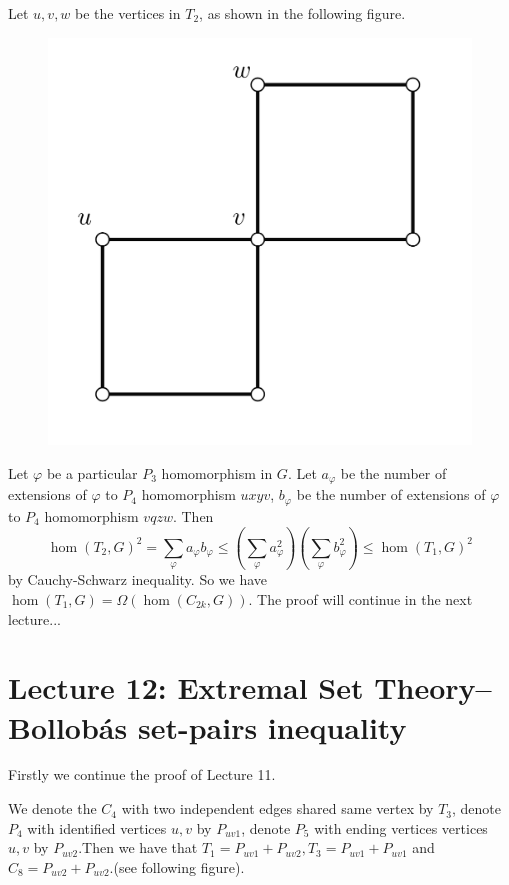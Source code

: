 \documentclass{article}
\theoremstyle{definition}
\renewcommand{\phi}{\varphi}
\begin{document}
Let $u,v,w$ be the vertices in $T_{2}$, as shown in the following figure.

\begin{figure}[H]
     \centering
     \includegraphics[scale=0.4]{11-5.png}
\end{figure}

Let $\phi$ be a particular $P_{3}$ homomorphism in $G$. Let $a_{\phi}$ be the number of extensions of $\phi$ to $P_{4}$ homomorphism $uxyv$, $b_{\phi}$ be the number of extensions of $\phi$ to $P_{4}$ homomorphism $vqzw$. Then
$$\hom(T_{2},G)^{2}=\sum_{\phi}a_{\phi}b_{\phi}\leq (\sum_{\phi}a_{\phi}^{2})(\sum_{\phi}b_{\phi}^{2})\leq \hom(T_{1},G)^{2}$$
by Cauchy-Schwarz inequality. So we have $\hom(T_{1},G)=\Omega(\hom(C_{2k},G))$. The proof will continue in the next lecture...


\newpage
\section{Lecture 12: Extremal Set Theory--Bollob\'as set-pairs inequality}

Firstly we continue the proof of Lecture 11.

We denote the $C_4$ with two independent edges shared same vertex by $T_3$, denote $P_4$ with identified vertices $u,v$ by $P_{uv1}$, denote $P_5$ with ending vertices vertices $u,v$ by $P_{uv2}$.Then we have that $T_1=P_{uv1}+P_{uv2},T_3=P_{uv1}+P_{uv1}$ and $C_8=P_{uv2}+P_{uv2}$.(see following figure).
\end{document}
